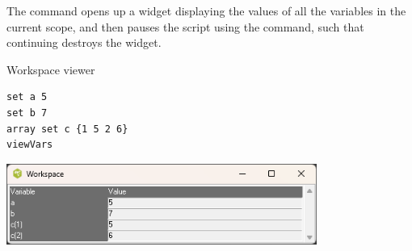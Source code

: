 \documentclass{article}
\renewcommand{\^}[1]{\textsuperscript{#1}}
\renewcommand{\_}[1]{\textsubscript{#1}}
\begin{document}
The command  opens up a  widget displaying the values of all the variables in the current scope, and then pauses the script using the  command, such that continuing destroys the widget. 
\begin{syntax}
\end{syntax}
\begin{example}{Workspace viewer}
\begin{lstlisting}
set a 5
set b 7
array set c {1 5 2 6}
viewVars
\end{lstlisting}
\tcblower

\includegraphics[width = 4in]{figures/workspace.png}
\end{example}
\end{document}

